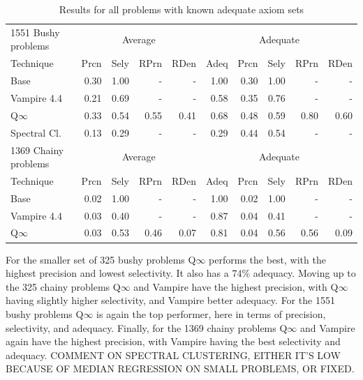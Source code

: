 \documentclass[EPiC]{easychair}
\begin{document}
\begin{table}[hbt]
\begin{center}
\begin{tabular}{|l|rrrr|r|rrrr|}
\hline
1551 Bushy problems  & \multicolumn{4}{|c|}{Average} & \multicolumn{5}{|c|}{Adequate} \\
Technique       & Prcn & Sely & RPrn & RDen & Adeq & Prcn & Sely & RPrn & RDen \\
\hline
Base            & 0.30 & 1.00 &  -   &  -   & 1.00 & 0.30 & 1.00 &  -   &  -   \\
Vampire 4.4     & 0.21 & 0.69 &  -   &  -   & 0.58 & 0.35 & 0.76 &  -   &  -   \\
Q$\infty$       & 0.33 & 0.54 & 0.55 & 0.41 & 0.68 & 0.48 & 0.59 & 0.80 & 0.60 \\
Spectral Cl.    & 0.13 & 0.29 &  -   &  -   & 0.29 & 0.44 & 0.54 &  -   &  -   \\
\hline
\hline
1369 Chainy problems & \multicolumn{4}{|c|}{Average} & \multicolumn{5}{|c|}{Adequate} \\
Technique       & Prcn & Sely & RPrn & RDen & Adeq & Prcn & Sely & RPrn & RDen \\
\hline
Base            & 0.02 & 1.00 &  -   &  -   & 1.00 & 0.02 & 1.00 &  -   &  -   \\
Vampire 4.4     & 0.03 & 0.40 &  -   &  -   & 0.87 & 0.04 & 0.41 &  -   &  -   \\
Q$\infty$       & 0.03 & 0.53 & 0.46 & 0.07 & 0.81 & 0.04 & 0.56 & 0.56 & 0.09 \\
\hline
\end{tabular}
\caption{Results for all problems with known adequate axiom sets}
\label{Results2078}
\end{center}
\end{table}

For the smaller set of 325 bushy problems Q$\infty$ performs the best, with
the highest precision and lowest selectivity.
It also has a 74\% adequacy.
Moving up to the 325 chainy problems Q$\infty$ and Vampire have the highest
precision, with Q$\infty$ having slightly higher selectivity, and Vampire
better adequacy.
For the 1551 bushy problems Q$\infty$ is again the top performer, here in
terms of precision, selectivity, and adequacy.
Finally, for the 1369 chainy problems Q$\infty$ and Vampire again have the 
highest precision, with Vampire having the best selectivity and adequacy.
COMMENT ON SPECTRAL CLUSTERING, EITHER IT'S LOW BECAUSE OF MEDIAN REGRESSION
ON SMALL PROBLEMS, OR FIXED.
\end{document}

